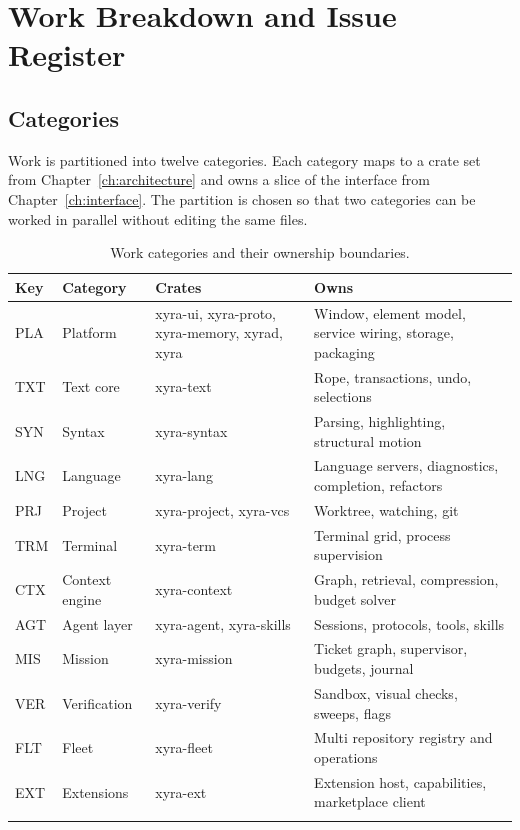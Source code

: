 \chapter{Work Breakdown and Issue Register}
\label{ch:breakdown}

\section{Categories}

Work is partitioned into twelve categories. Each category maps to a crate set from
Chapter~\ref{ch:architecture} and owns a slice of the interface from
Chapter~\ref{ch:interface}. The partition is chosen so that two categories can be worked in
parallel without editing the same files.

\begin{longtable}{@{}p{} p{} p{} p{}@{}}
\toprule
\textbf{Key} & \textbf{Category} & \textbf{Crates} & \textbf{Owns} \\
\midrule
\endhead
PLA & Platform & xyra-ui, xyra-proto, xyra-memory, xyrad, xyra & Window, element model, service wiring, storage, packaging \\
TXT & Text core & xyra-text & Rope, transactions, undo, selections \\
SYN & Syntax & xyra-syntax & Parsing, highlighting, structural motion \\
LNG & Language & xyra-lang & Language servers, diagnostics, completion, refactors \\
PRJ & Project & xyra-project, xyra-vcs & Worktree, watching, git \\
TRM & Terminal & xyra-term & Terminal grid, process supervision \\
CTX & Context engine & xyra-context & Graph, retrieval, compression, budget solver \\
AGT & Agent layer & xyra-agent, xyra-skills & Sessions, protocols, tools, skills \\
MIS & Mission & xyra-mission & Ticket graph, supervisor, budgets, journal \\
VER & Verification & xyra-verify & Sandbox, visual checks, sweeps, flags \\
FLT & Fleet & xyra-fleet & Multi repository registry and operations \\
EXT & Extensions & xyra-ext & Extension host, capabilities, marketplace client \\
\bottomrule
\caption{Work categories and their ownership boundaries.}
\end{longtable}

